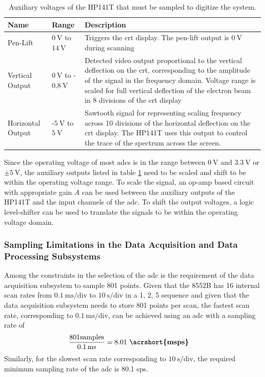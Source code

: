 \documentclass[class=report,11pt,crop=false]{standalone}
\begin{document}
	\begin{table}[!ht]
		\centering
		\begin{tabular}{|m{5em}|m{8em}|m{25em}|}
			\hline
			\cellcolor{cyan!25}\textbf{Name} & \cellcolor{cyan!25}\textbf{Range} & \cellcolor{cyan!25}\textbf{Description}\\
			\hline
			 Pen-Lift	&$\SI{0}{\volt}$ to $\SI{14}{\volt}$ & Triggers the \acrshort{crt} display. The pen-lift output is $\SI{0}{\volt}$ during scanning\\
			\hline
			Vertical Output	& $\SI{0}{\volt}$ to -$\SI{0.8}{\volt}$	& Detected video output proportional to the vertical deflection on the \acrshort{crt}, corresponding to the amplitude of the signal in the frequency domain. Voltage range is scaled for full vertical deflection of the electron beam in 8 divisions of the \acrshort{crt} display \\
			\hline
			 Horizontal Output	& -$\SI{5}{\volt}$ to $\SI{5}{\volt}$ & Sawtooth signal for representing scaling frequency across 10 divisions of the horizontal deflection on the \acrshort{crt} display. The HP141T uses this output to control the trace of the spectrum across the screen. \\
			\hline
		\end{tabular}
		\label{tab:hp141t-output-voltages}
		\caption{Auxiliary voltages of the HP141T that must be sampled to digitize the system.}
	\end{table}

	Since the operating voltage of most \acrshort{adc}s is in the range between $\SI{0}{\volt}$ and $\SI{3.3}{\volt}$ or $\pm\SI{5}{\volt}$, the auxiliary outputs listed in table \ref{tab:hp141t-output-voltages} need to be scaled and shift to be within the operating voltage range. To scale the signal, an op-amp based circuit with appropriate gain $A$ can be used between the auxiliary outputs of the HP141T and the input channels of the \acrshort{adc}. To shift the output voltages, a logic level-shifter can be used to translate the signals to be within the operating voltage domain. 

	\subsubsection{Sampling Limitations in the Data Acquisition and Data Processing Subsystems}
		
	Among the constraints in the selection of the \acrshort{adc} is the requirement of the data acquisition subsystem to sample 801 points. Given that the 8552B has 16 internal scan rates from $\SI{0.1}{\milli\second}/\text{div}$ to $\SI{10}{\second}/\text{div}$ in a 1, 2, 5 sequence and given that the data acquisition subsystem needs to store 801 points per scan, the fastest scan rate, corresponding to $\SI{0.1}{\milli\second}/\text{div}$, can be achieved using an \acrshort{adc} with a sampling rate of 
	\begin{align}
		\frac{801\text{samples}}{\SI{0.1}{\milli\second}}	& = 8.01~\textbf{\acrshort{msps}}\nonumber
	\end{align}
	Similarly, for the slowest scan rate corresponding to $\SI{10}{\second}/\text{div}$, the required minimum sampling rate of the \acrshort{adc} is 80.1 \acrshort{sps}.
	
\end{document}
